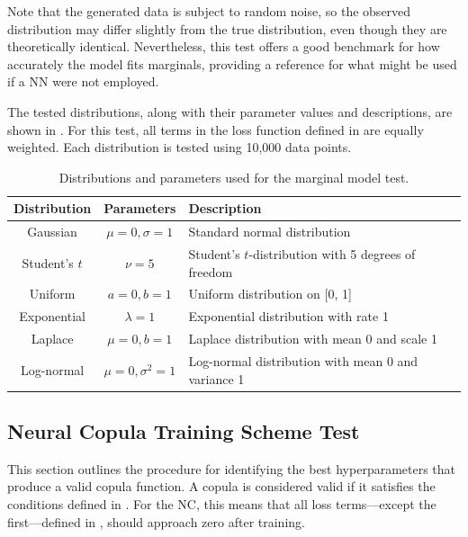 Note that the generated data is subject to random noise, so the observed distribution may differ slightly from the true distribution, even though they are theoretically identical. Nevertheless, this test offers a good benchmark for how accurately the model fits marginals, providing a reference for what might be used if a \gls{NN} were not employed.

The tested distributions, along with their parameter values and descriptions, are shown in . For this test, all terms in the loss function defined in  are equally weighted. Each distribution is tested using 10,000 data points.

\begin{table}[h]
    \centering
    \caption{Distributions and parameters used for the marginal model test.}
    \begin{tabular}{@{}ccl@{}}
        Distribution & Parameters & Description \\
        \toprule
        Gaussian & $\mu=0, \sigma=1$ & Standard normal distribution \\ 
        Student's $t$ & $\nu=5$ & Student's $t$-distribution with 5 degrees of freedom \\ 
        Uniform & $a=0, b=1$ & Uniform distribution on [0, 1] \\ 
        Exponential & $\lambda=1$ & Exponential distribution with rate 1 \\ 
        Laplace & $\mu=0, b=1$ & Laplace distribution with mean 0 and scale 1 \\ 
        Log-normal & $\mu=0, \sigma^2=1$ & Log-normal distribution with mean 0 and variance 1 \\ 
    \end{tabular}
    \label{tab:distributions}
\end{table}


\subsection{Neural Copula Training Scheme Test}
This section outlines the procedure for identifying the best hyperparameters that produce a valid copula function. A copula is considered valid if it satisfies the conditions defined in . For the \gls{NC}, this means that all loss terms—except the first—defined in , should approach zero after training.

